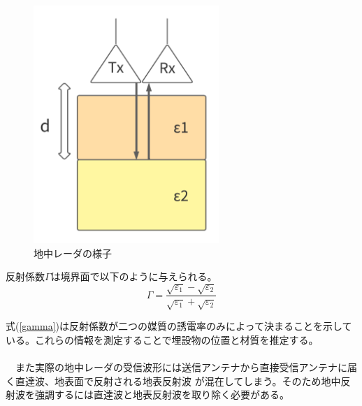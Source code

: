 \documentclass[12pt,a4paper]{jsreport}
\begin{document}
\begin{figure}[h]
  \begin{center}
   \includegraphics[width=7cm]{./image/antenna_depth_2.pdf}
   
  \caption{地中レーダの様子}\label{地中レーダの様子}
  \end{center}
  \end{figure}

反射係数$\Gamma$は境界面で以下のように与えられる。
\begin{equation}
  \Gamma=
  \frac{\sqrt{\varepsilon_{1}}-\sqrt{\varepsilon_{2}}}{\sqrt{\varepsilon_{1}}+\sqrt{\varepsilon_{2}}} 
\label{gamma}  
\end{equation}


式(\ref{gamma})は反射係数が二つの媒質の誘電率のみによって決まることを示している。これらの情報を測定することで埋設物の位置と材質を推定する。
\\
\\　また実際の地中レーダの受信波形には送信アンテナから直接受信アンテナに届く直達波、地表面で反射される地表反射波
が混在してしまう。そのため地中反射波を強調するには直達波と地表反射波を取り除く必要がある。
\end{document}
